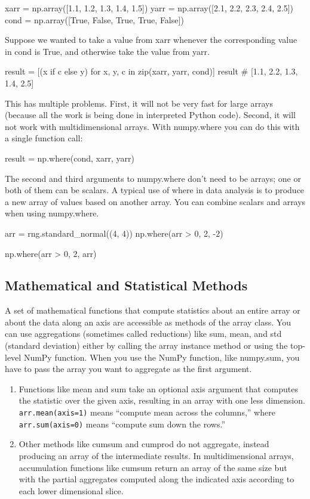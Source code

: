 \begin{pyc}
xarr = np.array([1.1, 1.2, 1.3, 1.4, 1.5])
yarr = np.array([2.1, 2.2, 2.3, 2.4, 2.5])
cond = np.array([True, False, True, True, False])
\end{pyc}
Suppose we wanted to take a value from xarr whenever the corresponding value in cond is True, and otherwise take the value from yarr.
\begin{pyc}
result = [(x if c else y) for x, y, c in zip(xarr, yarr, cond)]
result
# [1.1, 2.2, 1.3, 1.4, 2.5]
\end{pyc}

This has multiple problems. First, it will not be very fast for large arrays (because all the work is being done in interpreted Python code). Second, it will not work with multidimensional arrays. With numpy.where you can do this with a single function call:
\begin{pyc}
result = np.where(cond, xarr, yarr)
\end{pyc}

The second and third arguments to numpy.where don't need to be arrays; one or both of them can be scalars. A typical use of where in data analysis is to produce a new array of values based on another array. You can combine scalars and arrays when using numpy.where. 
\begin{pyc}
arr = rng.standard_normal((4, 4))
np.where(arr > 0, 2, -2)

np.where(arr > 0, 2, arr)
\end{pyc}

\subsection{Mathematical and Statistical Methods}
A set of mathematical functions that compute statistics about an entire array or about the data along an axis are accessible as methods of the array class. You can use aggregations (sometimes called reductions) like sum, mean, and std (standard deviation) either by calling the array instance method or using the top-level NumPy function. When you use the NumPy function, like numpy.sum, you have to pass the array you want to aggregate as the first argument.

\begin{enumerate}
    \item Functions like mean and sum take an optional axis argument that computes the statistic over the given axis, resulting in an array with one less dimension. \verb|arr.mean(axis=1)| means “compute mean across the columns,” where \verb|arr.sum(axis=0)| means “compute sum down the rows.” 
    \item Other methods like cumsum and cumprod do not aggregate, instead producing an array of the intermediate results. In multidimensional arrays, accumulation functions like cumsum return an array of the same size but with the partial aggregates computed along the indicated axis according to each lower dimensional slice.
\end{enumerate}

